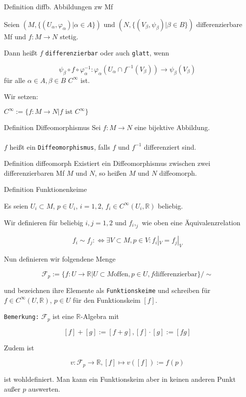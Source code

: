 \documentclass[a6paper,11pt,grid=front]{kartei}
\newcommand{\fl}[1]{\begin{flushleft}
 #1 \end{flushleft}}
\newcommand{\R}{\mathbb{R}}
\newcounter{def}
\begin{document}
\nonameyet
{\footnotesize Definition} {\footnotesize diffb. Abbildungen zw Mf}
{
Seien $(M,\{(U_\alpha, \varphi_\alpha)| \alpha \in A\})$ 
und $(N,\{(V_\beta, \psi_\beta)| \beta \in B\})$ 
differenzierbare Mf und $f: M\to N$ stetig.
\\
\fl{ Dann heißt $f$ \texttt{differenzierbar} oder auch \texttt{glatt}, wenn}
\[
\psi_\beta \circ f \circ \varphi_\alpha^{-1}:
\varphi_\alpha(U_\alpha \cap f^ {-1}(V_\beta)) \to 
\psi_\beta(V_\beta)
\]
für alle $\alpha\in A,\beta \in B$ $C^\infty$ ist.
\\
\fl{Wir setzen:}
$C^\infty := \{ f: M\to N| f \text{ ist } C^\infty\}$
}
{}

\nonameyet
{Definition} {Diffeomorphismus}
{
Sei $f: M \to N$ eine bijektive Abbildung.
\\
~\\
$f$ heißt ein \texttt{Diffeomorphismus}, falls $f$ und $f^{-1}$ differenziert
sind.
}
{}

\nonameyet
{Definition} {diffeomorph}
{
Existiert ein Diffeomorphismus zwischen zwei differenzierbaren Mf $M$ und $N$,
so heißen $M$ und $N$ diffeomorph.
}
{}




\nonameyet
{Definition} {Funktionenkeime}
{
\footnotesize
Es seien $U_i\subset M$, $p \in U_i$, $i = 1,2$, $f_i \in C^\infty(U_i,\R)$
beliebig.
%
\fl{Wir definieren für beliebig $i,j = 1,2$ und $f{_i,_j}$ wie oben eine
Äquivalenzrelation }
\[
f_i \sim f_j: \Leftrightarrow \exists V \subset M, p\in V: f_i|_V = f_j|_V
\]
\fl{Nun definieren wir folgendene Menge}
\[
\mathcal{F}_p := \{f: U \to \R | U \subset M \text{offen}, p \in U,
f \text{differenzierbar}\}/ \sim
\]
\fl{und bezeichnen ihre Elemente als \texttt{Funktionskeime} und schreiben
für $f\in C^\infty(U,\R)$, $p\in U$ für den Funktionskeim $[f]$.}
%
\scriptsize
\fl{\texttt{Bemerkung:}  $\mathcal{F}_p$ ist eine $\R$-Algebra mit }
\[
[f] + [g] := [f + g], [f]\cdot[g] := [fg]
\]
\fl{Zudem ist }
\[
v: \mathcal{F}_p \to \R, [f] \mapsto v([f]) := f(p)
\]
\fl{ist wohldefiniert. Man kann ein Funktionskeim aber in keinen anderen Punkt 
außer $p$ auswerten.}
}
{}
\end{document}
